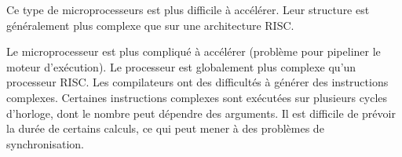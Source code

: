 Ce type de microprocesseurs est plus difficile à accélérer. Leur structure est généralement plus complexe que sur une architecture RISC.





Le microprocesseur est plus compliqué à accélérer (problème pour pipeliner le moteur d'exécution).
Le processeur est globalement plus complexe qu'un processeur RISC.
Les compilateurs ont des difficultés à générer des instructions complexes.
Certaines instructions complexes sont exécutées sur plusieurs cycles d'horloge, dont le nombre peut dépendre des arguments. Il est difficile de prévoir la durée de certains calculs, ce qui peut mener à des problèmes de synchronisation.

 




